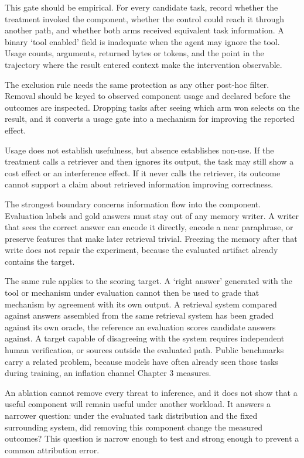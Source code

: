 This gate should be empirical. For every candidate task, record whether the treatment invoked the component, whether the control could reach it through another path, and whether both arms received equivalent task information. A binary `tool enabled' field is inadequate when the agent may ignore the tool. Usage counts, arguments, returned bytes or tokens, and the point in the trajectory where the result entered context make the intervention observable.

The exclusion rule needs the same protection as any other post-hoc filter. Removal should be keyed to observed component usage and declared before the outcomes are inspected. Dropping tasks after seeing which arm won selects on the result, and it converts a usage gate into a mechanism for improving the reported effect.

Usage does not establish usefulness, but absence establishes non-use. If the treatment calls a retriever and then ignores its output, the task may still show a cost effect or an interference effect. If it never calls the retriever, its outcome cannot support a claim about retrieved information improving correctness.

The strongest boundary concerns information flow into the component. Evaluation labels and gold answers must stay out of any memory writer. A writer that sees the correct answer can encode it directly, encode a near paraphrase, or preserve features that make later retrieval trivial. Freezing the memory after that write does not repair the experiment, because the evaluated artifact already contains the target.

The same rule applies to the scoring target. A `right answer' generated with the tool or mechanism under evaluation cannot then be used to grade that mechanism by agreement with its own output. A retrieval system compared against answers assembled from the same retrieval system has been graded against its own oracle, the reference an evaluation scores candidate answers against. A target capable of disagreeing with the system requires independent human verification, or sources outside the evaluated path. Public benchmarks carry a related problem, because models have often already seen those tasks during training, an inflation channel Chapter 3 measures.

An ablation cannot remove every threat to inference, and it does not show that a useful component will remain useful under another workload. It answers a narrower question: under the evaluated task distribution and the fixed surrounding system, did removing this component change the measured outcomes? This question is narrow enough to test and strong enough to prevent a common attribution error.


